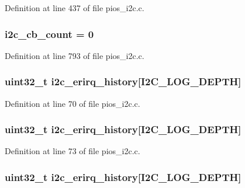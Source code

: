 Definition at line 437 of file pios\-\_\-i2c.\-c.

\hypertarget{group___p_i_o_s___i2_c_gadd232b764b6676824e5a173a7b78f9fd}{
\subsubsection[{i2c\-\_\-cb\-\_\-count}]{ i2c\-\_\-cb\-\_\-count = 0}}\label{group___p_i_o_s___i2_c_gadd232b764b6676824e5a173a7b78f9fd}


Definition at line 793 of file pios\-\_\-i2c.\-c.

\hypertarget{group___p_i_o_s___i2_c_ga682906503c30ce6f539ac8f7628346f8}{
\subsubsection[{i2c\-\_\-erirq\-\_\-history}]{ {\bf uint32\-\_\-t} i2c\-\_\-erirq\-\_\-history\mbox{[}I2\-C\-\_\-\-L\-O\-G\-\_\-\-D\-E\-P\-T\-H\mbox{]}}}\label{group___p_i_o_s___i2_c_ga682906503c30ce6f539ac8f7628346f8}


Definition at line 70 of file pios\-\_\-i2c.\-c.

\hypertarget{group___p_i_o_s___i2_c_ga682906503c30ce6f539ac8f7628346f8}{
\subsubsection[{i2c\-\_\-erirq\-\_\-history}]{ {\bf uint32\-\_\-t} i2c\-\_\-erirq\-\_\-history\mbox{[}I2\-C\-\_\-\-L\-O\-G\-\_\-\-D\-E\-P\-T\-H\mbox{]}}}\label{group___p_i_o_s___i2_c_ga682906503c30ce6f539ac8f7628346f8}


Definition at line 73 of file pios\-\_\-i2c.\-c.

\hypertarget{group___p_i_o_s___i2_c_ga682906503c30ce6f539ac8f7628346f8}{
\subsubsection[{i2c\-\_\-erirq\-\_\-history}]{ {\bf uint32\-\_\-t} i2c\-\_\-erirq\-\_\-history\mbox{[}I2\-C\-\_\-\-L\-O\-G\-\_\-\-D\-E\-P\-T\-H\mbox{]}}}\label{group___p_i_o_s___i2_c_ga682906503c30ce6f539ac8f7628346f8}


